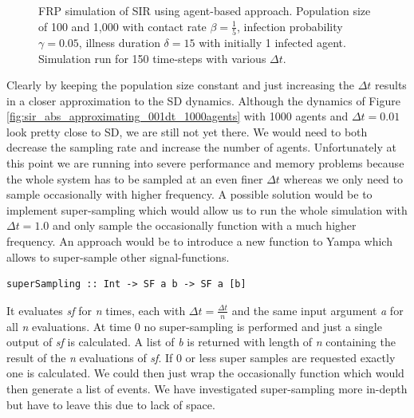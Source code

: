 \begin{figure}
\begin{center}
	\caption{FRP simulation of SIR using agent-based approach. Population size of 100 and 1,000 with contact rate $\beta = \frac{1}{5}$, infection probability $\gamma = 0.05$, illness duration $\delta = 15$ with initially 1 infected agent. Simulation run for 150 time-steps with various $\Delta t$.} 
	\label{fig:sir_abs_dynamics_frp}
\end{center}
\end{figure}

Clearly by keeping the population size constant and just increasing the $\Delta t$ results in a closer approximation to the SD dynamics. Although the dynamics of Figure \ref{fig:sir_abs_approximating_001dt_1000agents} with 1000 agents and $\Delta t = 0.01$ look pretty close to SD, we are still not yet there. We would need to both decrease the sampling rate and increase the number of agents. Unfortunately at this point we are running into severe performance and memory problems because the whole system has to be sampled at an even finer $\Delta t$ whereas we only need to sample occasionally with higher frequency. A possible solution would be to implement super-sampling which would allow us to run the whole simulation with $\Delta t = 1.0$ and only sample the occasionally function with a much higher frequency. An approach would be to introduce a new function to Yampa which allows to super-sample other signal-functions. 

\begin{verbatim}
superSampling :: Int -> SF a b -> SF a [b]
\end{verbatim}

It evaluates \textit{sf} for \textit{n} times, each with $\Delta t = \frac{\Delta t}{n}$ and the same input argument \textit{a} for all \textit{n} evaluations. At time 0 no super-sampling is performed and just a single output of \textit{sf} is calculated. A list of \textit{b} is returned with length of \textit{n} containing the result of the \textit{n} evaluations of \textit{sf}. If 0 or less super samples are requested exactly one is calculated. We could then just wrap the occasionally function which would then generate a list of events. We have investigated super-sampling more in-depth but have to leave this due to lack of space.

